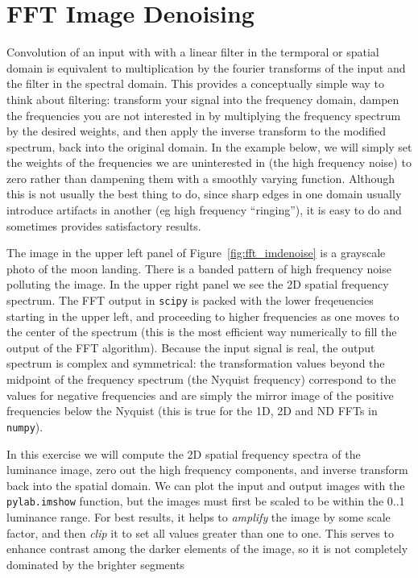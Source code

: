 \section{FFT Image Denoising}
\label{sec:fft_imdenoise}

Convolution of an input with with a linear filter in the termporal or spatial
domain is equivalent to multiplication by the fourier transforms of the input
and the filter in the spectral domain.  This provides a conceptually simple way
to think about filtering: transform your signal into the frequency domain,
dampen the frequencies you are not interested in by multiplying the frequency
spectrum by the desired weights, and then apply the inverse transform to the
modified spectrum, back into the original domain.  In the example below, we
will simply set the weights of the frequencies we are uninterested in (the high
frequency noise) to zero rather than dampening them with a smoothly varying
function.  Although this is not usually the best thing to do, since sharp edges
in one domain usually introduce artifacts in another (eg high frequency
``ringing''), it is easy to do and sometimes provides satisfactory results.

The image in the upper left panel of Figure~\ref{fig:fft_imdenoise} is a
grayscale photo of the moon landing.  There is a banded pattern of high
frequency noise polluting the image.  In the upper right panel we see the 2D
spatial frequency spectrum.  The FFT output in \texttt{scipy} is packed with
the lower freqeuencies starting in the upper left, and proceeding to higher
frequencies as one moves to the center of the spectrum (this is the most
efficient way numerically to fill the output of the FFT algorithm).  Because
the input signal is real, the output spectrum is complex and symmetrical: the
transformation values beyond the midpoint of the frequency spectrum (the
Nyquist frequency) correspond to the values for negative frequencies and are
simply the mirror image of the positive frequencies below the Nyquist (this is
true for the 1D, 2D and ND FFTs in \texttt{numpy}).

In this exercise we will compute the 2D spatial frequency spectra of the
luminance image, zero out the high frequency components, and inverse transform
back into the spatial domain.  We can plot the input and output images with the
\texttt{pylab.imshow} function, but the images must first be scaled to be
within the 0..1 luminance range.  For best results, it helps to
\textit{amplify} the image by some scale factor, and then \textit{clip} it to
set all values greater than one to one.  This serves to enhance contrast among
the darker elements of the image, so it is not completely dominated by the
brighter segments

